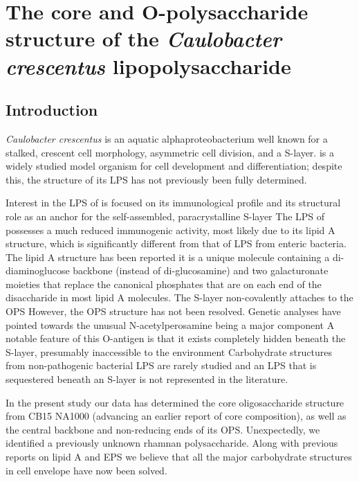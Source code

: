 \acresetall

\chapter{The core and O-polysaccharide structure of the \textit{Caulobacter crescentus} lipopolysaccharide}
\label{ch:lps}

\section{Introduction} %
\label{sec:introduction} 
	\textit{Caulobacter crescentus} is an aquatic alphaproteobacterium well known for a stalked, crescent cell morphology, asymmetric cell division, and a \ac{S-layer}. \caulobacter is a widely studied model organism for cell development and differentiation; despite this, the structure of its \ac{LPS} has not previously been fully determined.

	Interest in the \ac{LPS} of \caulobacter is focused on its immunological profile and its structural role as an anchor for the self-assembled, paracrystalline \ac{S-layer} The \ac{LPS} of \caulobacter possesses a much reduced immunogenic activity, most likely due to its lipid A structure, which is significantly different from that of \ac{LPS} from enteric bacteria. The lipid A structure has been reported it is a unique molecule containing a di-diaminoglucose backbone (instead of di-glucosamine) and two galacturonate moieties that replace the canonical phosphates that are on each end of the disaccharide in most lipid A molecules. The \caulobacter \ac{S-layer} non-covalently attaches to the \ac{OPS} However, the \ac{OPS} structure has not been resolved. Genetic analyses have pointed towards the unusual N-acetylperosamine being a major component A notable feature of this O-antigen is that it exists completely hidden beneath the S-layer, presumably inaccessible to the environment Carbohydrate structures from non-pathogenic bacterial \ac{LPS} are rarely studied and an \ac{LPS} that is sequestered beneath an \ac{S-layer} is not represented in the literature.

	In the present study our data has determined the core oligosaccharide structure from \caulobacter CB15 NA1000 (advancing an earlier report of core composition), as well as the central backbone and non-reducing ends of its OPS. Unexpectedly, we identified a previously unknown rhamnan polysaccharide. Along with previous reports on lipid A and \ac{EPS} we believe that all the major carbohydrate structures in \caulobacter cell envelope have now been solved.

